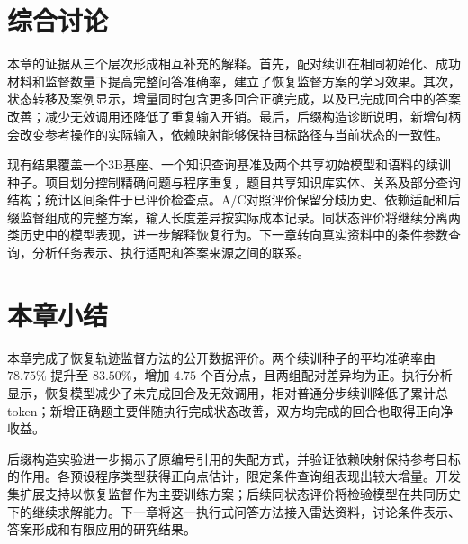

\section{综合讨论}

本章的证据从三个层次形成相互补充的解释。首先，配对续训在相同初始化、成功材料和监督数量下提高完整问答准确率，建立了恢复监督方案的学习效果。其次，状态转移及案例显示，增量同时包含更多回合正确完成，以及已完成回合中的答案改善；减少无效调用还降低了重复输入开销。最后，后缀构造诊断说明，新增句柄会改变参考操作的实际输入，依赖映射能够保持目标路径与当前状态的一致性。

现有结果覆盖一个3B基座、一个知识查询基准及两个共享初始模型和语料的续训种子。项目划分控制精确问题与程序重复，题目共享知识库实体、关系及部分查询结构；统计区间条件于已评价检查点。A/C对照评价保留分歧历史、依赖适配和后缀监督组成的完整方案，输入长度差异按实际成本记录。同状态评价将继续分离两类历史中的模型表现，进一步解释恢复行为。下一章转向真实资料中的条件参数查询，分析任务表示、执行适配和答案来源之间的联系。

\section{本章小结}

本章完成了恢复轨迹监督方法的公开数据评价。两个续训种子的平均准确率由 $78.75\%$ 提升至 $83.50\%$，增加 $4.75$ 个百分点，且两组配对差异均为正。执行分析显示，恢复模型减少了未完成回合及无效调用，相对普通分步续训降低了累计总 token；新增正确题主要伴随执行完成状态改善，双方均完成的回合也取得正向净收益。

后缀构造实验进一步揭示了原编号引用的失配方式，并验证依赖映射保持参考目标的作用。各预设程序类型获得正向点估计，限定条件查询组表现出较大增量。开发集扩展支持以恢复监督作为主要训练方案；后续同状态评价将检验模型在共同历史下的继续求解能力。下一章将这一执行式问答方法接入雷达资料，讨论条件表示、答案形成和有限应用的研究结果。
